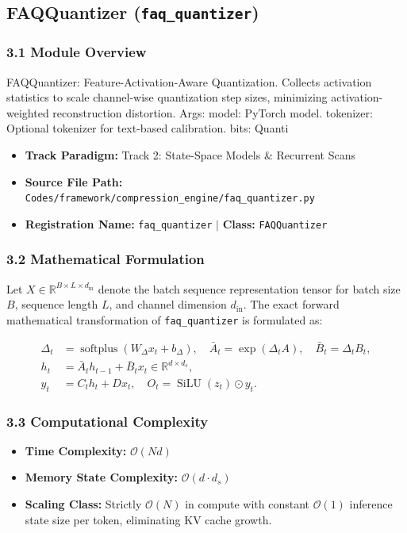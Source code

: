 \subsection{FAQQuantizer (\texttt{faq\_quantizer})}
\label{sec:app_module_faq\_quantizer}

\subsubsection*{3.1 Module Overview}
FAQQuantizer: Feature-Activation-Aware Quantization. Collects activation statistics to scale channel-wise quantization step sizes, minimizing activation-weighted reconstruction distortion.  Args:     model: PyTorch model.     tokenizer: Optional tokenizer for text-based calibration.     bits: Quanti
\begin{itemize}
    \item \textbf{Track Paradigm:} Track 2: State-Space Models & Recurrent Scans
    \item \textbf{Source File Path:} \texttt{Codes/framework/compression\_engine/faq\_quantizer.py}
    \item \textbf{Registration Name:} \texttt{faq\_quantizer} $\mid$ \textbf{Class:} \texttt{FAQQuantizer}
\end{itemize}

\subsubsection*{3.2 Mathematical Formulation}
Let $X \in \mathbb{R}^{B \times L \times d_{\text{in}}}$ denote the batch sequence representation tensor for batch size $B$, sequence length $L$, and channel dimension $d_{\text{in}}$. The exact forward mathematical transformation of \texttt{faq\_quantizer} is formulated as:

\begin{align}
\Delta_t &= \operatorname{softplus}(W_\Delta x_t + b_\Delta), \quad \bar{A}_t = \exp(\Delta_t A), \quad \bar{B}_t = \Delta_t B_t, \\
h_t &= \bar{A}_t h_{t-1} + \bar{B}_t x_t \in \mathbb{R}^{d \times d_s}, \\
y_t &= C_t h_t + D x_t, \quad O_t = \operatorname{SiLU}(z_t) \odot y_t.
\end{align}


\subsubsection*{3.3 Computational Complexity}
\begin{itemize}
    \item \textbf{Time Complexity:} $\mathcal{O}(N d)$
    \item \textbf{Memory State Complexity:} $\mathcal{O}(d \cdot d_s)$
    \item \textbf{Scaling Class:} Strictly $\mathcal{O}(N)$ in compute with constant $\mathcal{O}(1)$ inference state size per token, eliminating KV cache growth.
\end{itemize}

